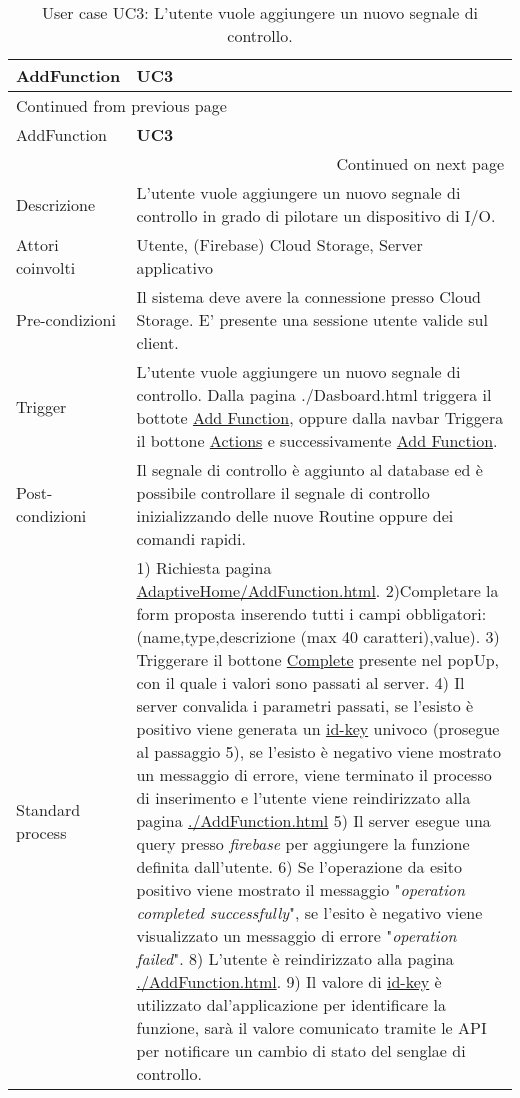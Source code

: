 \documentclass[onecolumn,a4paper]{article}
\begin{document}
\begin{longtable}{|l|p{9.7cm}|}
\caption{User case UC3: L'utente vuole aggiungere un nuovo segnale di controllo.}
\\
\cellcolor{grey!15}AddFunction & \cellcolor{grey!15} \textbf{UC3}\\
\hline
\endfirsthead
\multicolumn{2}{l}{Continued from previous page} \\
\hline

\cellcolor{grey!15}AddFunction & \cellcolor{grey!15} \textbf{UC3} \\

\hline
\endhead
\hline\multicolumn{2}{r}{Continued on next page} \\
\endfoot
\endlastfoot
\hline
Descrizione & L'utente vuole aggiungere un nuovo segnale di controllo in grado di pilotare un dispositivo di I/O.\\
\hline
Attori coinvolti & Utente, (Firebase) Cloud Storage, Server applicativo\\
\hline
Pre-condizioni & Il sistema deve avere la connessione presso Cloud Storage. E' presente una sessione utente valide sul client.\\
\hline
Trigger & L'utente vuole aggiungere un nuovo segnale di controllo. Dalla pagina ./Dasboard.html triggera il bottote \uline{Add Function}, oppure dalla navbar Triggera il bottone \uline{Actions} e successivamente \uline{Add Function}.\\
\hline
Post-condizioni & Il segnale di controllo è aggiunto al database ed è possibile controllare il segnale di controllo inizializzando delle nuove Routine oppure dei comandi rapidi.\\
\hline
Standard process & 1) Richiesta pagina \uline{AdaptiveHome/AddFunction.html}. 2)Completare la form proposta inserendo tutti i campi obbligatori: (name,type,descrizione (max 40 caratteri),value). 3) Triggerare il bottone \uline{Complete} presente nel popUp, con il quale i valori sono passati al server. 4) Il server convalida i parametri passati, se l'esisto è positivo viene generata un \uline{id-key} univoco (prosegue al passaggio 5), se l'esisto è negativo viene mostrato un messaggio di errore, viene terminato il processo di inserimento e l'utente viene reindirizzato alla pagina \uline{./AddFunction.html} 5) Il server esegue una query presso \emph{firebase} per aggiungere la funzione definita dall'utente. 6) Se l'operazione da esito positivo viene mostrato il messaggio "\emph{operation completed successfully}", se l'esito è negativo viene visualizzato un messaggio di errore "\emph{operation failed}". 8) L'utente è reindirizzato alla pagina \uline{./AddFunction.html}. 9) Il valore di \uline{id-key} è utilizzato dal'applicazione per identificare la funzione, sarà il valore comunicato tramite le API per notificare un cambio di stato del senglae di controllo.\\

\end{longtable}
\end{document}
